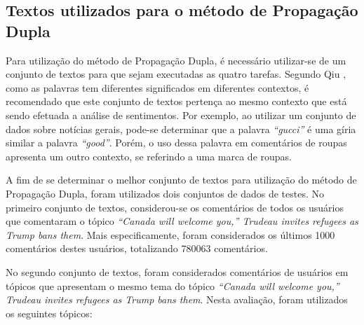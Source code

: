 \subsection{Textos utilizados para o método de Propagação Dupla}
\label{sec:textos}

Para utilização do método de Propagação Dupla, é necessário utilizar-se de um
conjunto de textos para que sejam executadas as quatro tarefas. Segundo Qiu \cite{Qiu:2011:OWE:1970420.1970422}, como as palavras tem diferentes
significados em diferentes contextos, é recomendado que este conjunto de textos
pertença ao mesmo contexto que está sendo efetuada a análise de sentimentos. Por
exemplo, ao utilizar um conjunto de dados sobre notícias gerais, pode-se
determinar que a palavra \textit{``gucci''} é uma gíria similar a palavra
\textit{``good''}. Porém, o uso dessa palavra em comentários de roupas
apresenta um outro contexto, se referindo a uma marca de roupas.

A fim de se determinar o melhor conjunto de textos para utilização do método de
Propagação Dupla, foram utilizados dois conjuntos de dados de testes. No
primeiro conjunto de textos, considerou-se os comentários de todos os usuários
que comentaram o tópico \textit{``Canada will welcome you,” Trudeau invites
refugees as Trump bans them}. Mais especificamente, foram considerados os
últimos 1000 comentários destes usuários, totalizando 780063 comentários.

No segundo
conjunto de textos, foram considerados comentários de usuários em tópicos
que apresentam o mesmo tema do tópico \textit{``Canada will welcome you,” Trudeau invites
refugees as Trump bans them}. Nesta avaliação, foram utilizados os
seguintes tópicos:

